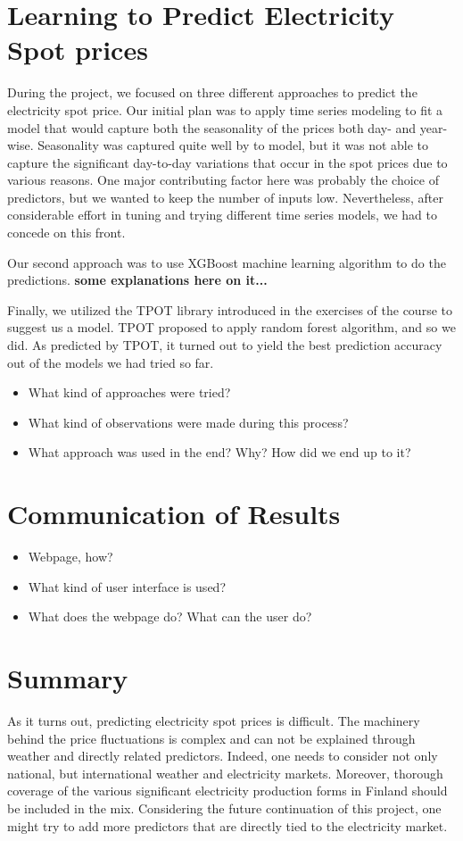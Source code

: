 \documentclass{article}
\numberwithin{equation}{section}
\begin{document}
\section{Learning to Predict Electricity Spot prices}
During the project, we focused on three different approaches to predict the electricity spot price. Our initial plan was to apply time series modeling to fit a model that would capture both the seasonality of the prices both day- and year-wise. Seasonality was captured quite well by to model, but it was not able to capture the significant day-to-day variations that occur in the spot prices due to various reasons. One major contributing factor here was probably the choice of predictors, but we wanted to keep the number of inputs low. Nevertheless, after considerable effort in tuning and trying different time series models, we had to concede on this front.

Our second approach was to use XGBoost machine learning algorithm to do the predictions. \textbf{some explanations here on it...}

Finally, we utilized the TPOT library introduced in the exercises of the course to suggest us a model. TPOT proposed to apply random forest algorithm, and so we did. As predicted by TPOT, it turned out to yield the best prediction accuracy out of the models we had tried so far.

\begin{itemize}
	\item What kind of approaches were tried?
	\item What kind of observations were made during this process?
	\item What approach was used in the end? Why? How did we end up to it?
\end{itemize}

\section{Communication of Results}
\begin{itemize}
	\item Webpage, how?
	\item What kind of user interface is used?
	\item What does the webpage do? What can the user do?
\end{itemize}

\section{Summary}
As it turns out, predicting electricity spot prices is difficult. The machinery behind the price fluctuations is complex and can not be explained through weather and directly related predictors. Indeed, one needs to consider not only national, but international weather and electricity markets. Moreover, thorough coverage of the various significant electricity production forms in Finland should be included in the mix. Considering the future continuation of this project, one might try to add more predictors that are directly tied to the electricity market. 
\end{document}
